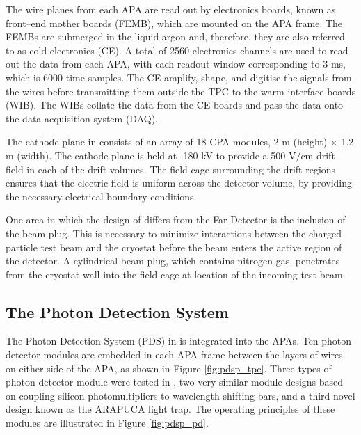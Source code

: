 The wire planes from each APA are read out by electronics boards, known as
front--end mother boards (FEMB), which are mounted on the APA frame. The FEMBs 
are submerged in the liquid argon and, therefore, they are also referred to as 
cold electronics (CE). A total of 2560 electronics channels are used to read 
out the data from each APA, with each readout window corresponding to 3 ms, 
which is 6000 time samples. The CE amplify, shape, and digitise the signals 
from the wires before transmitting them outside the TPC to the warm interface 
boards (WIB). The WIBs collate the data from the CE boards and pass the data 
onto the data acquisition system (DAQ).

The cathode plane in \protodune{} consists of an array of 18 CPA modules, 2 m 
(height) $\times$ 1.2 m (width). The cathode plane is held at -180 kV to 
provide a 500 $\mbox{V/cm}$ drift field in each of the drift volumes. The 
field cage surrounding the drift regions ensures that the electric field is 
uniform across the detector volume, by providing the necessary electrical
boundary conditions.

One area in which the design of \protodune{} differs from the Far Detector is
the inclusion of the beam plug. This is necessary to minimize interactions
between the charged particle test beam and the cryostat before the beam enters 
the active region of the detector. A cylindrical beam plug, which contains 
nitrogen gas, penetrates from the cryostat wall into the field cage at 
location of the incoming test beam. 

\subsection{The Photon Detection System}

The Photon Detection System (PDS) in \protodune{} is integrated into the APAs. 
Ten photon detector modules are embedded in each APA frame between the layers 
of wires on either side of the APA, as shown in Figure \ref{fig:pdsp_tpc}. 
Three types of photon detector module were tested in \protodune{}, two very 
similar module designs based on coupling silicon photomultipliers to 
wavelength shifting bars, and a third novel design known as the ARAPUCA light 
trap. The operating principles of these modules are illustrated in Figure 
\ref{fig:pdsp_pd}.

